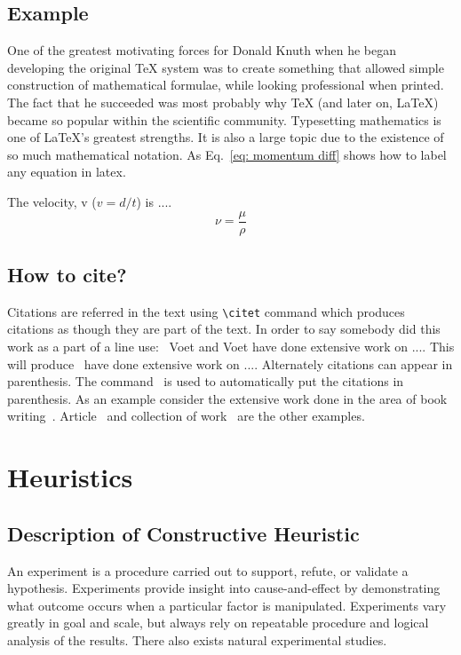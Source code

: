 \documentclass[11pt, a4paper]{article}
\begin{document}
\subsection{Example}
One of the greatest motivating forces for Donald Knuth when he began developing the original TeX system was to create something that allowed simple construction of mathematical formulae, while looking professional when printed. The fact that he succeeded was most probably why TeX (and later on, LaTeX) became so popular within the scientific community. Typesetting mathematics is one of LaTeX's greatest strengths. It is also a large topic due to the existence of so much mathematical notation. As Eq.~\ref{eq: momentum diff} shows how to label any equation in latex. 

The velocity, v ($v=d/t$) is ....
%
\begin{equation}\label{eq: momentum diff}
\nu = \frac{\mu}{\rho}
\end{equation}

\subsection{How to cite?}
Citations are referred in the text using \verb|\citet| command which produces citations
as though they are part of the text. In order to say somebody did this work as a part of a line use:~ Voet and Voet have done extensive work on .... This will produce~\citet{voet2011biochemistry} have done extensive work on .... Alternately citations can appear in parenthesis. The command~\citep{voet2011biochemistry} is used to automatically put the citations in parenthesis. As an example consider the extensive work done in the area of book writing~\citep{seifert1991shape}.
Article~\citep{sircar1972adsorption,keh1995particle} and collection of work~\citep{seifert1995morphology} are the other examples.

\section{Heuristics}\label{sec:exp}

\subsection{Description of Constructive Heuristic}
An experiment is a procedure carried out to support, refute, or validate a hypothesis. Experiments provide insight into cause-and-effect by demonstrating what outcome occurs when a particular factor is manipulated. Experiments vary greatly in goal and scale, but always rely on repeatable procedure and logical analysis of the results. There also exists natural experimental studies.
\end{document}
